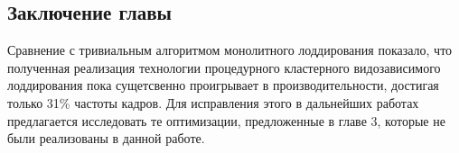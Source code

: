 


\subsection*{Заключение главы}
Сравнение с тривиальным алгоритмом монолитного лоддирования показало, что полученная реализация технологии процедурного кластерного видозависимого лоддирования пока сущетсвенно проигрывает в производительности, достигая только 31\% частоты кадров.
Для исправления этого в дальнейших работах предлагается исследовать те оптимизации, предложенные в главе 3, которые не были реализованы в данной работе.
